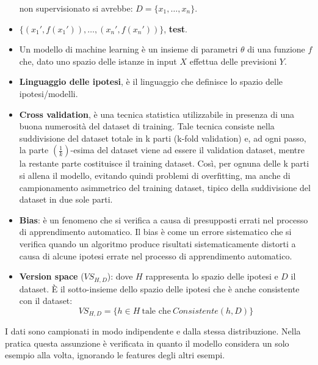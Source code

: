 \begin{itemize}
          non supervisionato si avrebbe: $D = \{x_1, \dots, x_n\}$.
    \item $\{(x_1', f(x_1')), \dots, (x_n', f(x_n'))\}$, \textbf{test}.
    \item Un modello di machine learning è un insieme di parametri $\theta$ di una
          funzione $f$ che, dato uno spazio delle istanze in input $X$ effettua delle
          previsioni $Y$.
    \item \textbf{Linguaggio delle ipotesi}, è il linguaggio che definisce lo
          spazio delle ipotesi/modelli.
    \item \textbf{Cross validation}, è una tecnica statistica utilizzabile in
          presenza di una buona numerosità del dataset di training. Tale tecnica consiste
          nella suddivisione del dataset totale in k parti (k-fold validation) e,
          ad ogni passo, la parte $ \left(\frac{1}{k}\right)$-esima del dataset viene
          ad essere il validation dataset, mentre la restante parte costituisce il
          training dataset. Così, per ognuna delle k parti si allena il modello,
          evitando quindi problemi di overfitting, ma anche di campionamento
          asimmetrico del training dataset, tipico della suddivisione del dataset in due sole parti.
    \item \textbf{Bias}: è un fenomeno che si verifica a causa di presupposti
          errati nel processo di apprendimento automatico. Il bias è come un errore
          sistematico che si verifica quando un algoritmo produce risultati sistematicamente
          distorti a causa di alcune ipotesi errate nel processo di apprendimento automatico.
    \item \textbf{Version space} ($VS_{H, D}$): dove $H$ rappresenta lo spazio
          delle ipotesi e $D$ il dataset. È il sotto-insieme dello spazio delle ipotesi
          che è anche consistente con il dataset:
          \begin{equation}
              VS_{H, D} = \{h \in H \ \text{tale che} \ Consistente(h, D)\}
          \end{equation}
\end{itemize}
\begin{definizione} 
    I dati sono campionati in modo indipendente e dalla stessa distribuzione.
    Nella pratica questa assunzione è verificata in quanto il modello considera
    un solo esempio alla volta, ignorando le features degli altri esempi.
\end{definizione}
